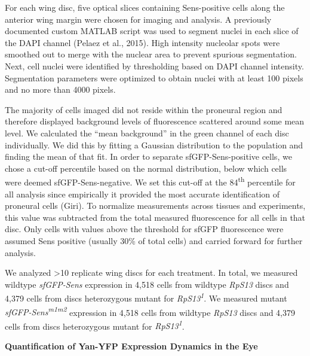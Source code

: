 For each wing disc, five optical slices containing Sens-positive cells along the anterior wing margin were chosen for imaging and analysis. A previously documented custom MATLAB script was used to segment nuclei in each slice of the DAPI channel (Pelaez et al., 2015). High intensity nucleolar spots were smoothed out to merge with the nuclear area to prevent spurious segmentation. Next, cell nuclei were identified by thresholding based on DAPI channel intensity. Segmentation parameters were optimized to obtain nuclei with at least 100 pixels and no more than 4000 pixels.

The majority of cells imaged did not reside within the proneural region and therefore displayed background levels of fluorescence scattered around some mean level. We calculated the ``mean background'' in the green channel of each disc individually. We did this by fitting a Gaussian distribution to the population and finding the mean of that fit. In order to separate sfGFP-Sens-positive cells, we chose a cut-off percentile based on the normal distribution, below which cells were deemed sfGFP-Sens-negative. We set this cut-off at the 84\textsuperscript{th} percentile for all analysis since empirically it provided the most accurate identification of proneural cells (Giri). To normalize measurements across tissues and experiments, this value was subtracted from the total measured fluorescence for all cells in that disc. Only cells with values above the threshold for sfGFP fluorescence were assumed Sens positive (usually 30\% of total cells) and carried forward for further analysis.

We analyzed \textgreater{}10 replicate wing discs for each treatment. In total, we measured wildtype \emph{sfGFP-Sens} expression in 4,518 cells from wildtype \emph{RpS13} discs and 4,379 cells from discs heterozygous mutant for \emph{RpS13\textsuperscript{1}}. We measured mutant \emph{sfGFP-Sens\textsuperscript{m1m2}} expression in 4,518 cells from wildtype \emph{RpS13} discs and 4,379 cells from discs heterozygous mutant for \emph{RpS13\textsuperscript{1}}.

\textbf{Quantification of Yan-YFP Expression Dynamics in the Eye}

